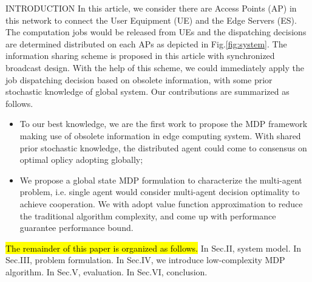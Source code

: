 \documentclass[10pt, conference, letterpaper]{IEEEtran}
\begin{document}
\begin{section}{INTRODUCTION}
        In this article, we consider there are Access Points (AP) in this network to connect the User Equipment (UE) and the Edge Servers (ES).
        The computation jobs would be released from UEs and the dispatching decisions are determined distributed on each APs as depicted in Fig.\ref{fig:system}.
        The information sharing scheme is proposed in this article with synchronized broadcast design. With the help of this scheme, we could immediately apply the job dispatching decision based on obsolete information, with some prior stochastic knowledge of global system.
        Our contributions are summarized as follows.
        \begin{itemize}
            \item To our best knowledge, we are the first work to propose the MDP framework making use of obsolete information in edge computing system. With shared prior stochastic knowledge, the distributed agent could come to consensus on optimal oplicy adopting globally;
            \item We propose a global state MDP formulation to characterize the multi-agent problem, i.e. single agent would consider multi-agent decision optimality to achieve cooperation.
            We with adopt value function approximation to reduce the traditional algorithm complexity, and come up with performance guarantee performance bound.
        \end{itemize}

        \hl{The remainder of this paper is organized as follows.}
        In Sec.II, system model.
        In Sec.III, problem formulation.
        In Sec.IV, we introduce low-complexity MDP algorithm.
        In Sec.V, evaluation.
        In Sec.VI, conclusion.
    \end{section}
\end{document}
